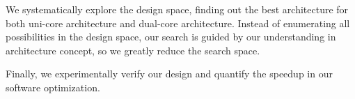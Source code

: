 \documentclass[twocolumn,letterpaper,10pt]{article}
\begin{document}
We systematically explore the design space, finding out the best
architecture for both uni-core architecture and dual-core
architecture. Instead of enumerating all possibilities in the design
space, our search is guided by our understanding in architecture
concept, so we greatly reduce the search space.

Finally, we experimentally verify our design and quantify the speedup
in our software optimization.



\end{document}
